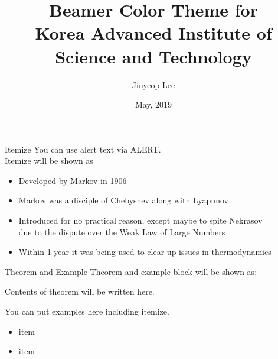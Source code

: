 \documentclass[english]{beamer} %
\begin{document}
\title[Beamer Color Theme for KAIST]{Beamer Color Theme for \\Korea Advanced Institute of Science and Technology}

\author{Jinyeop Lee}
\date{May, 2019}


\begin{frame}
  \titlepage
\end{frame}

\begin{frame}{Itemize}
You can use alert text via \alert{ALERT}.\\
Itemize will be shown as
\begin{itemize}[<+->]
\item Developed by Markov in 1906
\item Markov was a disciple of Chebyshev  along with Lyapunov
\item Introduced for no practical reason, except maybe to spite Nekrasov\\
due to the dispute over the Weak Law of Large Numbers
\item Within 1 year it was being used to clear up issues in thermodynamics
\end{itemize}
\end{frame}

\begin{frame}{Theorem and Example}
Theorem and example block will be shown as:
\begin{theorem}
	Contents of theorem will be written here.
\end{theorem}

\begin{example}
	You can put examples here including itemize.
	\begin{itemize}
		\item item
		\item item
	\end{itemize}
\end{example}
\end{frame}
\end{document}
